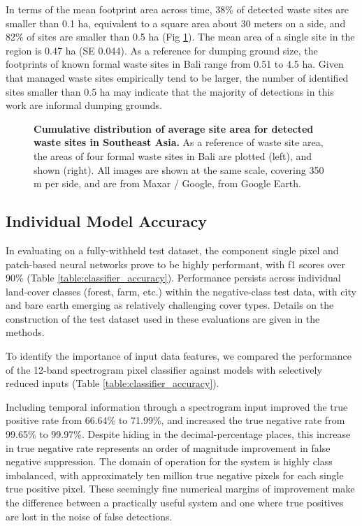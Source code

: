 \documentclass[10pt,letterpaper]{article}
\begin{document}
In terms of the mean footprint area across time, 38\% of detected waste sites are smaller than 0.1 ha, equivalent to a square area about 30 meters on a side, and 82\% of sites are smaller than 0.5 ha (Fig \ref{fig:site_areas}). The mean area of a single site in the region is 0.47 ha (SE 0.044). As a reference for dumping ground size, the footprints of known formal waste sites in Bali range from 0.51 to 4.5 ha. Given that managed waste sites empirically tend to be larger, the number of identified sites smaller than 0.5 ha may indicate that the majority of detections in this work are informal dumping grounds.

\begin{figure}[!h]
    \caption{{\bf Cumulative distribution of average site area for detected waste sites in Southeast Asia.}
    As a reference of waste site area, the areas of four formal waste sites in Bali are plotted (left), and shown (right). All images are shown at the same scale, covering 350 m per side, and are from Maxar / Google, from Google Earth.}
    \label{fig:site_areas}
\end{figure}

\subsection*{Individual Model Accuracy}\label{results:accuracy}
In evaluating on a fully-withheld test dataset, the component single pixel and patch-based neural networks prove to be highly performant, with f1 scores over 90\% (Table \ref{table:classifier_accuracy}). Performance persists across individual land-cover classes (forest, farm, etc.) within the negative-class test data, with city and bare earth emerging as relatively challenging cover types. Details on the construction of the test dataset used in these evaluations are given in the methods.

To identify the importance of input data features, we compared the performance of the 12-band spectrogram pixel classifier against models with selectively reduced inputs (Table \ref{table:classifier_accuracy}).

Including temporal information through a spectrogram input improved the true positive rate from 66.64\% to 71.99\%, and increased the true negative rate from 99.65\% to 99.97\%. Despite hiding in the decimal-percentage places, this increase in true negative rate represents an order of magnitude improvement in false negative suppression. The domain of operation for the system is highly class imbalanced, with approximately ten million true negative pixels for each single true positive pixel. These seemingly fine numerical margins of improvement make the difference between a practically useful system and one where true positives are lost in the noise of false detections.
\end{document}
